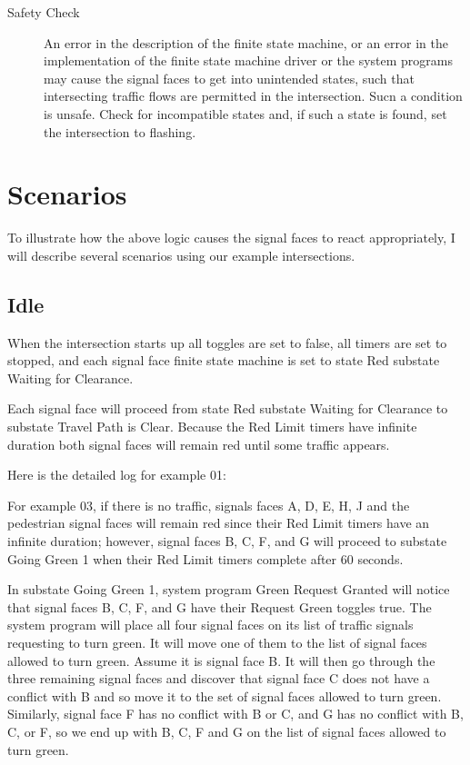 \documentclass[letterpaper,twoside]{article}
\begin{document}
\begin{description}
\item[Safety Check]

An error in the description of the finite state machine, or an error
in the implementation of the finite state machine driver or the
system programs may cause the signal faces to get into unintended
states, such that intersecting traffic flows are permitted in the
intersection.  Sucn a condition is unsafe.  Check for incompatible
states and, if such a state is found, set the intersection to flashing.

\end{description}

\section{Scenarios}

To illustrate how the above logic causes the signal faces to react
appropriately, I will describe several scenarios using our example
intersections.

\subsection{Idle}

When the intersection starts up all toggles are set to false,
all timers are set to stopped, and each signal face finite state machine
is set to state Red substate Waiting for Clearance.

Each signal face will proceed
from state Red substate Waiting for Clearance to substate Travel Path is Clear.
Because the Red Limit timers have infinite duration both signal faces
will remain red until some traffic appears.

Here is the detailed log for example 01:



For example 03, if there is no traffic, signals faces A, D, E, H, J and the
pedestrian signal faces will remain red
since their Red Limit timers have an infinite duration; however,
signal faces B, C, F, and G will proceed to substate Going Green 1 when
their Red Limit timers complete after 60 seconds.

In substate Going Green 1, system program Green Request Granted will notice
that signal faces B, C, F, and G have their Request Green toggles true.
The system program will place all four signal faces on its list of traffic
signals requesting to turn green.  It will move one of them to the list
of signal faces allowed to turn green.  Assume it is signal face B.
It will then go through the three
remaining signal faces and discover that signal face C does not have
a conflict with B and so move it to the set of signal faces allowed
to turn green.  Similarly, signal face F has no conflict with B or C,
and G has no conflict with B, C, or F, so we end up with B, C, F and G
on the list of signal faces allowed to turn green.
\end{document}
